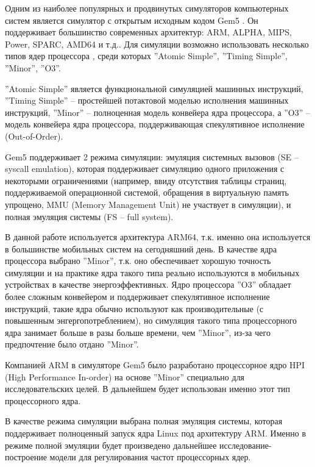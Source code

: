     Одним из наиболее популярных и продвинутых симуляторов компьютерных систем является симулятор
    с открытым исходным кодом Gem5 \cite{binkert2011gem5}. Он поддерживает большинство современных
    архитектур: ARM, ALPHA, MIPS, Power, SPARC, AMD64 и т.д.. Для симуляции возможно использовать
    несколько типов ядер процессора \cite{gem52017ArchExpl}, среди которых ''Atomic Simple'',
    ''Timing Simple'', ''Minor'', ''O3''.

    ''Atomic Simple'' является функциональной симуляцией
    машинных инструкций, ''Timing Simple'' -- простейшей потактовой моделью исполнения машинных
    инструкций, ''Minor'' -- полноценная модель конвейера ядра процессора,
    а ''O3'' -- модель конвейера ядра процессора, поддерживающая спекулятивное исполнение (Out-of-Order).

    Gem5 поддерживает 2 режима симуляции: эмуляция системных вызовов (SE -- syscall emulation), которая
    поддерживает симуляцию одного приложения с некоторыми ограничениями (например, ввиду отсутствия таблицы
    страниц, поддерживаемой операционной системой, обращения в виртуальную память упрощено, MMU (Memory
    Management Unit) не участвует в симуляции), и полная эмуляция системы (FS -- full system).

    В данной работе используется архитектура ARM64, т.к. именно она используется в большинстве мобильных
    систем на сегодняшний день. В качестве ядра процессора выбрано ''Minor'', т.к. оно обеспечивает
    хорошую точность симуляции и на практике ядра такого типа реально используются в мобильных
    устройствах в качестве энергоэффективных. Ядро процессора ''O3'' обладает более сложным конвейером и
    поддерживает спекулятивное исполнение инструкций, такие ядра обычно используют как производительные
    (с повышенным энгергопотреблением), но симуляция такого типа процессорного ядра занимает больше
    в разы больше времени, чем ''Minor'', из-за чего предпочтение было отдано ''Minor''.

    Компанией ARM в симуляторе Gem5 было разработано процессорное ядро HPI (High Performance In-order)
    \cite{gem52017HPI} на основе ''Minor'' специально для исследовательских целей. В дальнейшем
    будет использован именно этот тип процессорного ядра.

    В качестве режима симуляции выбрана полная эмуляция системы, которая поддерживает полноценный запуск
    ядра Linux под архитектуру ARM. Именно в режиме полной эмуляции будет произведено дальнейшее
    исследование-построение модели для регулирования частот процессорных ядер.

\newpage
